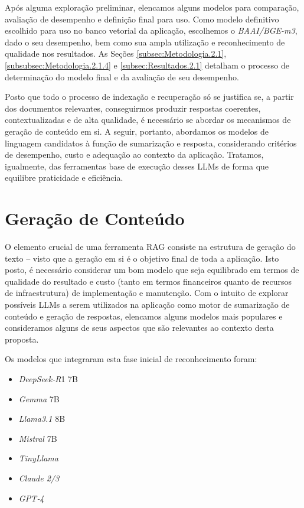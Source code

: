 Após alguma exploração preliminar, elencamos alguns modelos para comparação, avaliação de desempenho e definição final para uso. Como modelo definitivo escolhido para uso no banco vetorial da aplicação, escolhemos o \textit{BAAI/BGE-m3}, dado o seu desempenho, bem como sua ampla utilização e reconhecimento de qualidade nos resultados. As Seções \ref{subsec:Metodologia.2.1}, \ref{subsubsec:Metodologia.2.1.4} e \ref{subsec:Resultados.2.1} detalham o processo de determinação do modelo final e da avaliação de seu desempenho.

Posto que todo o processo de indexação e recuperação só se justifica se, a partir dos documentos relevantes, conseguirmos produzir respostas coerentes, contextualizadas e de alta qualidade, é necessário se abordar os mecanismos de geração de conteúdo em si. A seguir, portanto, abordamos os modelos de linguagem candidatos à função de sumarização e resposta, considerando critérios de desempenho, custo e adequação ao contexto da aplicação. Tratamos, igualmente, das ferramentas base de execução desses \ac{LLM}s de forma que equilibre praticidade e eficiência.

\section{Geração de Conteúdo}
\label{sec:Assistente.2}
O elemento crucial de uma ferramenta \ac{RAG} consiste na estrutura de geração do texto -- visto que a geração em si é o objetivo final de toda a aplicação. Isto posto, é necessário considerar um bom modelo que seja equilibrado em termos de qualidade do resultado e custo (tanto em termos financeiros quanto de recursos de infraestrutura) de implementação e manutenção. Com o intuito de explorar possíveis \ac{LLM}s a serem utilizados na aplicação como motor de sumarização de conteúdo e geração de respostas, elencamos alguns modelos mais populares e consideramos alguns de seus aspectos que são relevantes ao contexto desta proposta.

Os modelos que integraram esta fase inicial de reconhecimento foram:

\begin{itemize}
    \item \textit{DeepSeek‑R}1 7B \cite{DeepSeek:1}
    \item \textit{Gemma} 7B \cite{Gemma:1}
    \item \textit{Llama3.1} 8B \cite{Llama:1}
    \item \textit{Mistral} 7B \cite{Mistral:1}
    \item \textit{TinyLlama} \cite{TinyLlama:1}
    \item \textit{Claude 2/3} \cite{Claude:1}
    \item \textit{GPT‑4} \cite{GPT4o:1}
\end{itemize}

